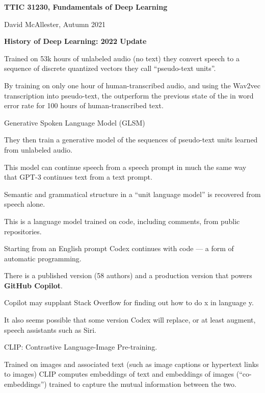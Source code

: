 




{\Huge
  \centerline{\bf TTIC 31230,  Fundamentals of Deep Learning}
  \vfill
  \centerline{David McAllester, Autumn 2021}
  \vfill
  \centerline{\bf History of Deep Learning: 2022 Update}

\vfill
\vfill


\vfill
Trained on 53k hours of unlabeled audio (no text) they convert speech to a sequence of discrete quantized vectors they call ``pseudo-text units''.

\vfill
By training on only one hour of human-transcribed audio, and using the Wav2vec transcription into pseudo-text, the outperform the previous state of the
in word error rate for 100 hours of human-transcribed text.



Generative Spoken Language Model (GLSM)

\vfill
They then train a generative model of the sequences of pseudo-text units learned from unlabeled audio.


\vfill
This model can continue speech from a speech prompt in much the same way that GPT-3 continues text from a text prompt.

\vfill
Semantic and grammatical structure in a ``unit language model'' is recovered
from speech alone.


This is a language model trained on code, including comments, from public repositories.

\vfill
Starting from an English prompt Codex continues with code --- a form of automatic programming.

\vfill
There is a published version (58 authors) and a production version that powers {\bf GitHub Copilot}.

\vfill
Copilot may supplant Stack Overflow for finding out how to do x in language y.

\vfill
It also seems possible that some version Codex will replace, or at least augment, speech assistants such as Siri.


CLIP: Contrastive Language-Image Pre-training.

\vfill
Trained on images and associated text (such as image captions or hypertext links to images) CLIP computes embeddings of text and embeddings of images
(``co-embeddings'') trained to capture the mutual information between the two.

}

